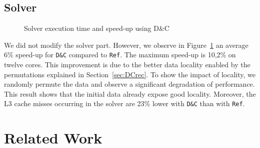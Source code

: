 \documentclass[10pt]{IOS-Book-Article}
\begin{document}
\subsection{Solver}
\begin{figure}[htp]
 \caption{Solver execution time and speed-up using D\&C}
 \label{fig:solCurves}
\end{figure}

We did not modify the solver part.
However, we observe in Figure~\ref{fig:solCurves} an average 6\% speed-up for {\tt D\&C} compared to {\tt Ref}.
The maximum speed-up is 10,2\% on twelve cores.
This improvement is due to the better data locality enabled by the permutations explained in Section~\ref{sec:DCrec}.
To show the impact of locality, we randomly permute the data and observe a significant degradation of performance.
This result shows that the initial data already expose good locality.
Moreover, the L3 cache misses occurring in the solver are 23\% lower with {\tt D\&C} than with {\tt Ref}.


\section{Related Work}
\label{sec:rw}
\end{document}
